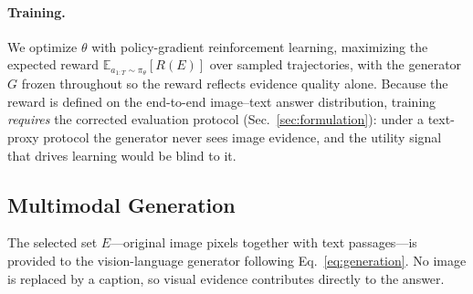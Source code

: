\paragraph{Training.}
We optimize $\theta$ with policy-gradient reinforcement learning, maximizing the
expected reward $\mathbb{E}_{a_{1:T}\sim\pi_\theta}\!\left[R(E)\right]$ over
sampled trajectories, with the generator $G$ frozen throughout so the reward
reflects evidence quality alone. Because the reward is defined on the end-to-end
image--text answer distribution, training \emph{requires} the corrected
evaluation protocol (Sec.~\ref{sec:formulation}): under a text-proxy protocol the
generator never sees image evidence, and the utility signal that drives learning
would be blind to it.

\subsection{Multimodal Generation}
\label{sec:generation}

The selected set $E$---original image pixels together with text passages---is
provided to the vision-language generator following Eq.~\ref{eq:generation}. No
image is replaced by a caption, so visual evidence contributes directly to the
answer.

